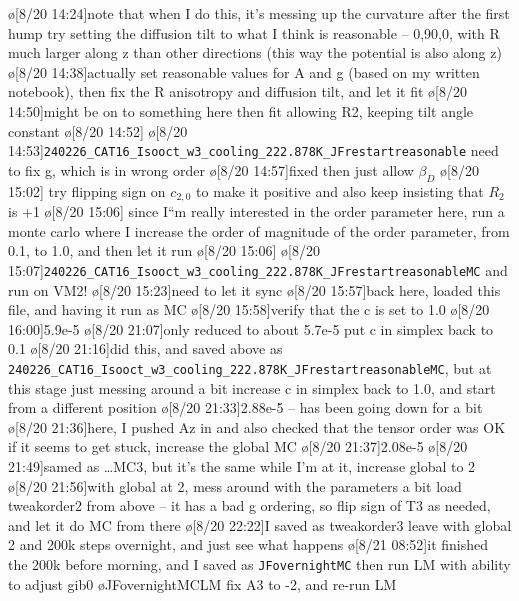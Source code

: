 \begin{err}
    \o[8/20 14:24]{note that when I do this, it's messing up the curvature after the first hump}
    try setting the diffusion tilt to what I think is reasonable -- 0,90,0, with R much larger along z than other directions
    (this way the potential is also along z)
    \o[8/20 14:38]{actually}
    set reasonable values for A and g (based on my written notebook), then fix the R anisotropy and diffusion tilt, and let it fit
    \o[8/20 14:50]{might be on to something here}
    then fit allowing R2, keeping tilt angle constant
    \o[8/20 14:52]{}
    \o[8/20 14:53]{\texttt{240226_CAT16_Isooct_w3_cooling_222.878K_JFrestartreasonable}}
    need to fix g, which is in wrong order
    \o[8/20 14:57]{fixed}
    then just allow $\beta_D$
    \o[8/20 15:02]{}
    try flipping sign on $c_{2,0}$ to make it positive
    and also keep insisting that $R_2$ is +1
    \o[8/20 15:06]{}
    since I``m really interested in the order parameter here, run a monte carlo where I increase the order of magnitude of the order parameter, from 0.1, to 1.0, and then let it run
    \o[8/20 15:06]{}
    \o[8/20 15:07]{\texttt{240226_CAT16_Isooct_w3_cooling_222.878K_JFrestartreasonableMC}}
    and run on VM2!
    \o[8/20 15:23]{need to let it sync}
    \o[8/20 15:57]{back here, loaded this file, and having it run as MC}
    \o[8/20 15:58]{verify that the c is set to 1.0}
    \o[8/20 16:00]{5.9e-5}
    \o[8/20 21:07]{only reduced to about 5.7e-5}
    put c in simplex back to 0.1
    \o[8/20 21:16]{did this, and saved above as \texttt{240226_CAT16_Isooct_w3_cooling_222.878K_JFrestartreasonableMC}, but at this stage just messing around a bit}
    increase c in simplex back to 1.0, and start from a different position
    \o[8/20 21:33]{2.88e-5 -- has been going down for a bit}
    \o[8/20 21:36]{here, I pushed Az in and also checked that the tensor order was OK}
    if it seems to get stuck, increase the global MC
    \o[8/20 21:37]{2.08e-5}
    \o[8/20 21:49]{samed as \ldots MC3, but it's the same}
    while I'm at it, increase global to 2
    \o[8/20 21:56]{with global at 2, mess around with the parameters a bit}
    load tweakorder2 from above -- it has a bad g ordering, so flip sign of T3 as needed, and let it do MC from there
    \o[8/20 22:22]{I saved as tweakorder3}
    leave with global 2 and 200k steps overnight, and just see what happens
    \o[8/21 08:52]{it finished the 200k before morning, and I saved as \texttt{JFovernightMC}}
    then run LM with ability to adjust gib0
    \o{JFovernightMCLM}
    fix A3 to -2, and re-run LM

\end{err}
